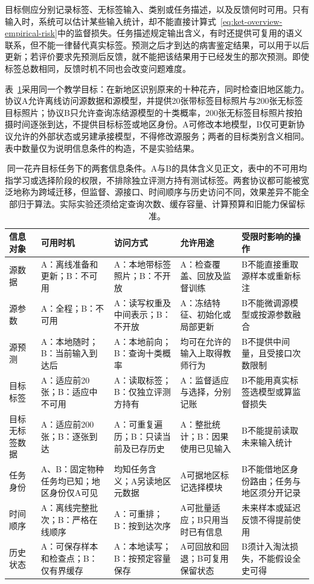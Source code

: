 目标侧应分别记录标签、无标签输入、类别或任务描述，以及反馈何时可用。只有输入时，系统可以估计某些输入统计，却不能直接计算式~\eqref{eq:ket-overview-empirical-risk}中的监督损失。任务描述规定输出含义，有时还提供可复用的语义联系，但不能一律替代真实标签。预测之后才到达的病害鉴定结果，可以用于以后更新；若评价要求先预测后反馈，就不能把该结果用于已经发生的那次预测。即使标签总数相同，反馈时机不同也会改变问题难度。

表~\ref{tab:ket-overview-information}采用同一个教学目标：在新地区识别原来的十种花卉，同时检查旧地区能力。协议A允许离线访问源数据和源模型，并提供20张带标签目标照片与200张无标签目标照片；协议B只允许查询冻结源模型的十类概率，200张无标签目标照片按拍摄时间逐张到达，不提供目标标签或地区身份。A可修改本地模型，B仅可更新协议允许的外部状态或另建承接模型，不得修改源服务；两者的目标类别含义相同。表中数量仅为说明信息条件的构造，不是实验结果。

\begin{table}[htbp]
  \centering
  \small
  \begin{tabularx}{\linewidth}{@{}p{17mm}XXXX@{}}
    \toprule
    信息对象 & 可用时机 & 访问方式 & 允许用途 & 受限时影响的操作 \\
    \midrule
    源数据 & A：离线准备和更新；B：不可用 & A：本地带标签照片；B：不开放 & A：检查覆盖、回放及监督训练 & B不能直接重取源样本或重新标注 \\
    源参数 & A：全程；B：不可用 & A：读写权重及中间表示；B：不开放 & A：冻结特征、初始化或局部更新 & B不能微调源模型或按源参数融合 \\
    源预测 & A：本地随时；B：当前输入到达后 & A：本地前向；B：查询十类概率 & 均可在允许的输入上取得教师行为 & B不提供中间量，且受接口次数限制 \\
    目标标签 & A：适应前20张；B：适应中不可用 & A：读取标签；B：仅独立评测方持有 & A：监督适应与选择，分别记账 & B不能用真实标签选模型或算监督损失 \\
    目标无标签数据 & A：适应前200张；B：逐张到达 & A：可重复遍历；B：只读当前及已存历史 & A：整批统计；B：因果使用已见输入 & B不能提前读取未来输入统计 \\
    任务身份 & A、B：固定物种任务均已知；地区身份仅A可见 & 均知任务含义；A另读地区元数据 & A可据地区标记选择模块 & B不能借地区身份路由；任务与地区须分开记录 \\
    时间顺序 & A：离线完整批次；B：严格在线顺序 & A：可重排；B：按到达次序 & A可批量适应；B只用当时已有信息 & 未来样本或延迟反馈不得提前使用 \\
    历史状态 & A：可保存样本和检查点；B：仅有界缓存 & A：本地读写；B：按预定容量保存 & A可回放和回退；B可复用保留状态 & B须计入淘汰损失，不能假设全史可得 \\
    \bottomrule
  \end{tabularx}
  \caption{同一花卉目标任务下的两套信息条件。A与B的具体含义见正文，表中的不可用均指学习或选择阶段的权限，不排除独立评测方持有测试标签。两套协议都可能被宽泛地称为跨域迁移，但监督、源接口、时间顺序与历史访问不同，效果差异不能全部归于算法。实际实验还须给定查询次数、缓存容量、计算预算和旧能力保留标准。}
  \label{tab:ket-overview-information}
\end{table}

